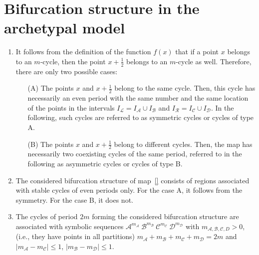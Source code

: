 \documentclass[12pt]{article}
\renewcommand{\L}{{\mathcal L}}
\newcommand{\A}{{\mathcal A}}
\newcommand{\B}{{\mathcal B}}
\newcommand{\C}{{\mathcal C}}
\newcommand{\D}{{\mathcal D}}
\newcommand{\R}{{\mathcal R}}
\renewcommand{\leq}{\leqslant}
\begin{document}
\section{Bifurcation structure in the archetypal model}

\begin{enumerate}
  \item It follows from the definition of the function $f(x)$ that if a
        point $x$ belongs to an $m$-cycle, then the point $x+\frac{1}{2}$
        belongs to an $m$-cycle as well. Therefore, there are only two
        possible cases:
        \begin{itemize}
          \item[(A)] The points $x$ and $x+\frac{1}{2}$ belong to the same
            cycle.  Then, this cycle has necessarily an even period with the
            same number and the same location of the points in the intervals
            $I_\L = I_\A \cup I_\B$ and $I_\R = I_\C \cup I_\D$.  In the
            following, such cycles are referred to as symmetric cycles or
            cycles of type A.
          \item[(B)] The points $x$ and $x+\frac{1}{2}$ belong to different cycles.
            Then, the map has necessarily two coexisting cycles
            of the same period, referred to in the following as asymmetric cycles
            or cycles of type B.
        \end{itemize}
  \item
        The considered bifurcation structure of map~\eqref{} consists of regions
        associated with stable cycles of even periods only.  For the case A,
        it follows from the symmetry. For the case B, it does not.
  \item
        The cycles of period $2m$ forming the considered bifurcation
        structure are associated with symbolic sequences
        $\A^{m_\A}\:\B^{m_\B}\:\C^{m_\C}\:\D^{m_\D}$ with
        $m_{\A,\B,\C,D}>0$, (i.e., they have points in all partitions)
        $m_\A+m_\B+m_\C+m_\D=2m$ and $|m_\A-m_\C|\leq 1$, $|m_\B-m_\D|\leq
          1$.


\end{enumerate}
\end{document}
